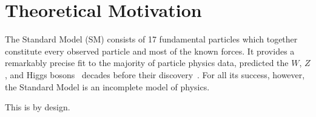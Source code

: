 \chapter{Theoretical Motivation}

The Standard Model (SM) consists of 17 fundamental particles which together constitute every observed particle and most of the known forces.
It provides a remarkably precise fit to the majority of particle physics data, predicted the $W$, $Z$, and Higgs bosons~\cite{wzmass1,higgs1,higgs2} decades before their discovery~\cite{ua1w,ua2w,ua1z,ua2z,atlashiggs,cmshiggs}.
For all its success, however, the Standard Model is an incomplete model of physics.

This is by design.




